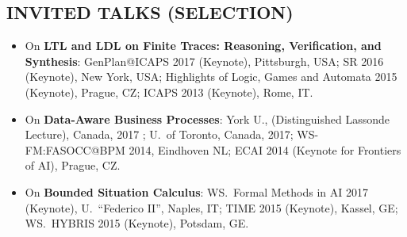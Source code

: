 \vspace{-1ex}
\subsection*{INVITED TALKS (SELECTION)}
\vspace{-1ex}

\begin{itemize}[topsep=0pt,itemsep=-1ex,partopsep=1ex,parsep=1ex]


\item 
On \textbf{LTL and LDL on Finite Traces: Reasoning, Verification, and Synthesis}:
GenPlan@ICAPS 2017 (Keynote), Pittsburgh, USA; SR 2016 (Keynote), New York, USA; Highlights of Logic, Games and Automata 2015 (Keynote), Prague, CZ; ICAPS 2013 (Keynote), Rome, IT.


\item 
On \textbf{Data-Aware Business Processes}:  York U., (Distinguished Lassonde Lecture), Canada, 2017 ; U.\ of Toronto, Canada, 2017; WS-FM:FASOCC@BPM 2014, Eindhoven NL;  ECAI 2014 (Keynote for Frontiers of AI), Prague, CZ. 



\item 
On \textbf{Bounded Situation Calculus}: WS.\ Formal Methods in AI 2017 (Keynote), U.\  ``Federico II'', Naples, IT; TIME 2015 (Keynote), Kassel, GE; WS.\ HYBRIS 2015 (Keynote), Potsdam, GE.  


\end{itemize}
